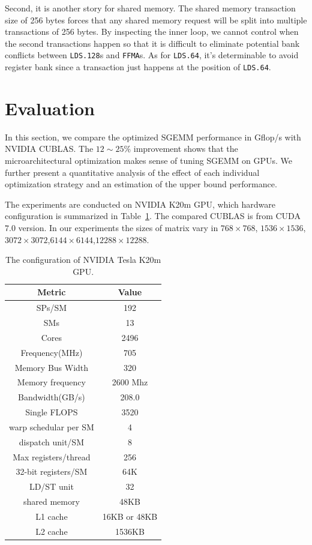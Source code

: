 \documentclass{sig-alternate-05-2015}
\begin{document}
Second, it is another story for shared memory. The shared memory transaction size of 256 bytes forces that any shared memory request will be split into multiple transactions of 256 bytes. By inspecting the inner loop, we cannot control when the second transactions happen so that it is difficult to eliminate potential bank conflicts between {\tt LDS.128}s and {\tt FFMA}s. As for {\tt LDS.64}, it's determinable to avoid register bank since a transaction just happens at the position of {\tt LDS.64}.



\section{Evaluation}

In this section, we compare the optimized SGEMM performance in Gflop/s with NVIDIA CUBLAS. The $12\sim 25\%$ improvement shows that the microarchitectural optimization makes sense of tuning SGEMM on GPUs.   We further present a quantitative analysis of the effect of each individual optimization strategy and an estimation of the upper bound performance.

The experiments are conducted on NVIDIA K20m GPU, which hardware configuration is summarized in Table~\ref{table:k20}. The compared CUBLAS is from CUDA $7.0$ version. In our experiments the sizes of matrix vary in $768\times768$, $1536\times1536$,$3072\times3072$,$6144\times6144$,$12288\times12288$.

\begin{table}[!t]
\caption{The configuration of NVIDIA Tesla K20m GPU.}
\centering
\scalebox{1.0} {
\begin{tabular}{|c||c|}
\hline
Metric& Value\\
\hline
SPs/SM &192\\
\hline
    SMs&13\\
\hline
Cores &2496\\
\hline
Frequency(MHz)&705\\
\hline
Memory Bus Width&320\\
\hline
Memory frequency&2600 Mhz\\
\hline
Bandwidth(GB/s)&208.0\\
\hline
Single FLOPS&3520\\
\hline
warp schedular per SM&4\\
\hline
dispatch unit/SM&8\\
\hline
Max registers/thread&256 \\
\hline
32-bit registers/SM&64K\\
\hline
LD/ST unit&32 \\
\hline
shared memory&48KB\\
\hline
L1 cache&16KB or 48KB\\
\hline
    L2 cache&1536KB\\
\hline
\end{tabular}
}
\label{table:k20}
\end{table}
\end{document}
